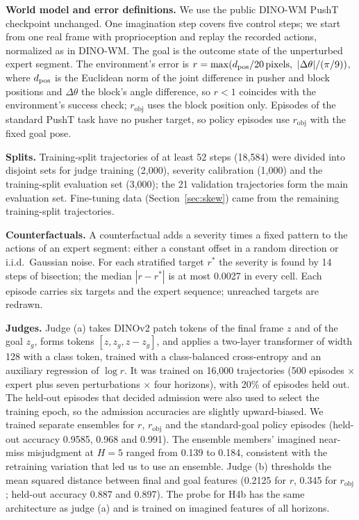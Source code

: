 \documentclass[10pt]{article}
\newcommand{\rob}{r_{\mathrm{obj}}}
\begin{document}
\textbf{World model and error definitions.} We use the public DINO-WM PushT checkpoint unchanged. One imagination step covers five control steps; we start from one real frame with proprioception and replay the recorded actions, normalized as in DINO-WM. The goal is the outcome state of the unperturbed expert segment. The environment's error is $r=\max(d_{\rm pos}/20\,\text{pixels},\ |\Delta\theta|/(\pi/9))$, where $d_{\rm pos}$ is the Euclidean norm of the joint difference in pusher and block positions and $\Delta\theta$ the block's angle difference, so $r<1$ coincides with the environment's success check; $\rob$ uses the block position only. Episodes of the standard PushT task have no pusher target, so policy episodes use $\rob$ with the fixed goal pose.

\textbf{Splits.} Training-split trajectories of at least 52 steps (18,584) were divided into disjoint sets for judge training (2,000), severity calibration (1,000) and the training-split evaluation set (3,000); the 21 validation trajectories form the main evaluation set. Fine-tuning data (Section~\ref{sec:skew}) came from the remaining training-split trajectories.

\textbf{Counterfactuals.} A counterfactual adds a severity times a fixed pattern to the actions of an expert segment: either a constant offset in a random direction or i.i.d.\ Gaussian noise. For each stratified target $r^*$ the severity is found by 14 steps of bisection; the median $|r-r^*|$ is at most 0.0027 in every cell. Each episode carries six targets and the expert sequence; unreached targets are redrawn.

\textbf{Judges.} Judge (a) takes DINOv2 patch tokens of the final frame $z$ and of the goal $z_g$, forms tokens $[z, z_g, z-z_g]$, and applies a two-layer transformer of width 128 with a class token, trained with a class-balanced cross-entropy and an auxiliary regression of $\log r$. It was trained on 16,000 trajectories (500 episodes $\times$ expert plus seven perturbations $\times$ four horizons), with 20\% of episodes held out. The held-out episodes that decided admission were also used to select the training epoch, so the admission accuracies are slightly upward-biased. We trained separate ensembles for $r$, $\rob$ and the standard-goal policy episodes (held-out accuracy 0.9585, 0.968 and 0.991). The ensemble members' imagined near-miss misjudgment at $H=5$ ranged from 0.139 to 0.184, consistent with the retraining variation that led us to use an ensemble. Judge (b) thresholds the mean squared distance between final and goal features (0.2125 for $r$, 0.345 for $\rob$; held-out accuracy 0.887 and 0.897). The probe for H4b has the same architecture as judge (a) and is trained on imagined features of all horizons.
\end{document}
